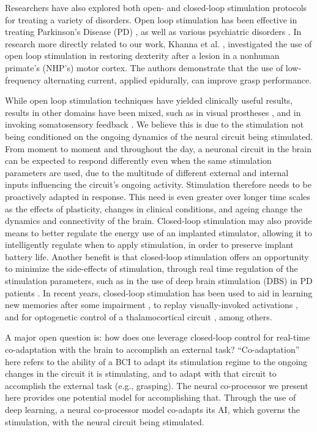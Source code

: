 \documentclass[12pt]{iopart}
\begin{document}
Researchers have also explored both open- and closed-loop stimulation protocols for
treating a variety of disorders. Open loop stimulation has been effective in
treating Parkinson's Disease (PD) \cite{benabid.parkinsons}, as well as various
psychiatric disorders \cite{holtzheimer.psy, kisely.psy, fraint.psy}.
In research more directly related to our work, Khanna et al. \cite{khanna.openloop}, investigated 
the use of open loop stimulation in restoring dexterity after a lesion in a nonhuman primate's (NHP's) motor cortex.
The authors demonstrate that the use of low-frequency alternating current, applied epidurally,
can improve grasp performance.

While open loop stimulation techniques have yielded clinically useful results, results in other domains have been mixed, such as in visual
prostheses \cite{bosking.visual}, and in invoking somatosensory feedback
\cite{cronin.tact}. We believe this is due to the stimulation not being conditioned
on the ongoing dynamics of the neural circuit being stimulated. From moment to moment and
throughout the day, a neuronal circuit in the brain can be expected to respond differently even when the same stimulation parameters are used,
due to the multitude of different external and internal inputs influencing the circuit's ongoing activity. Stimulation
therefore needs to be proactively adapted in response. This need is even
greater over longer time scales as the effects of plasticity, changes in clinical conditions, and ageing change
the dynamics and connectivity of the brain. Closed-loop stimulation may also provide means
to better regulate the energy use of an implanted stimulator, allowing it to
intelligently regulate when to apply stimulation, in order to preserve implant
battery life. Another benefit is that closed-loop stimulation offers an opportunity to minimize the 
side-effects of stimulation, through real time regulation
of the stimulation parameters, such as in the use of deep brain stimulation (DBS) in
PD patients \cite{little.park}. In recent years, closed-loop stimulation has been used to aid in learning
new memories after some impairment \cite{berger.closedloop, kahana.biomarker},
to replay visually-invoked activations \cite{tafazoli.acls}, and for optogenetic
control of a thalamocortical circuit \cite{bolus.opto}, among others.

A major open question is: how does one leverage closed-loop control for real-time
co-adaptation with the brain to accomplish an external task? ``Co-adaptation'' here refers
to the ability of a BCI to adapt its stimulation regime to the ongoing
changes in the circuit it is stimulating, and to adapt with that circuit to accomplish
the external task (e.g., grasping). The neural co-processor we present here provides one
potential model for accomplishing that. Through the use of deep learning, a neural 
co-processor model co-adapts its AI, which governs the
stimulation, with the neural circuit being stimulated.
\end{document}
